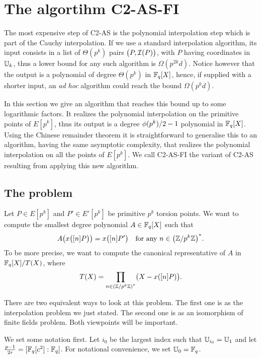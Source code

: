 \section{The algortihm C2-AS-FI}
\label{sec:C2-AS-FI}

The most expensive step of C2-AS is the polynomial interpolation step
which is part of the Cauchy interpolation. If we use a standard
interpolation algorithm, its input consists in a list of $\Theta(p^k)$
pairs $\bigl(P, \mathcal{I}(P)\bigr)$, with $P$ having coordinates in $\mathbb{U}_k$,
thus a lower bound for any such algorithm is $\Omega(p^{2k}d)$. Notice
however that the output is a polynomial of degree $\Theta(p^k)$ in
$\mathbb{F}_q[X]$, hence, if supplied with a shorter input, an \emph{ad hoc}
algorithm could reach the bound $\Omega(p^kd)$.

In this section we give an algorithm that reaches this bound up to
some logarithmic factors. It realizes the polynomial interpolation on
the primitive points of $E[p^k]$, thus its output is a degree
$\phi(p^k)/2-1$ polynomial in $\mathbb{F}_q[X]$. Using the Chinese remainder
theorem it is straightforward to generalise this to an algorithm,
having the same asymptotic complexity, that realizes the polynomial
interpolation on all the points of $E[p^k]$. We call C2-AS-FI the
variant of C2-AS resulting from applying this new algorithm.


\subsection{The problem}
Let $P\in E[p^k]$ and $P'\in E'[p^k]$ be primitive $p^k$ torsion
points. We want to compute the smallest degree polynomial
$A\in\mathbb{F}_q[X]$ such that
\begin{equation}
  A\bigl(x\bigl([n]P\bigr)\bigr) = x\bigl([n]P'\bigr)
  \quad\text{for any $n\in\left(\mathbb{Z}/p^k\mathbb{Z}\right)^\ast$.}
\end{equation}
To be more precise, we want to compute the canonical representative of
$A$ in $\mathbb{F}_q[X]/T(X)$, where
\begin{equation}
  T(X) = \prod_{n\in\left(\mathbb{Z}/p^k\mathbb{Z}\right)^\ast} \bigl(X - x([n]P)\bigr)
  \text{.}
\end{equation}
 
There are two equivalent ways to look at this problem. The first one
is as the interpolation problem we just stated. The second one is as
an isomorphism of finite fields problem. Both viewpoints will be
important.

We set some notation first. Let $i_0$ be the largest index such that
$\mathbb{U}_{i_0} = \mathbb{U}_1$ and let $\frac{p-1}{2r} = [\mathbb{F}_q[c^2]:\mathbb{F}_q]$. For
notational convenience, we set $\mathbb{U}_0=\mathbb{F}_q$.

